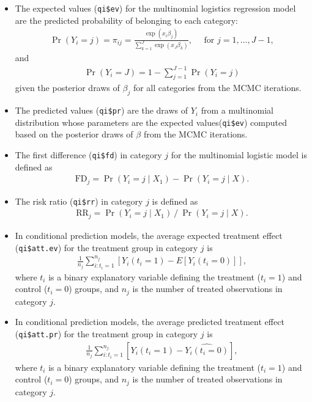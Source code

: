 \begin{itemize}
\item The expected values (\texttt{qi\$ev}) for the multinomial logistics
 regression model are the predicted probability of belonging to each
 category:
\begin{eqnarray*}
\Pr(Y_i=j)=\pi_{ij}=\frac{\exp(x_i \beta_j)}{\sum_{k=1}^J \exp(x_J
\beta_k)}, \quad \textrm{ for } j=1,\ldots, J-1,
\end{eqnarray*}
and 
\begin{eqnarray*}
\Pr(Y_i=J)=1-\sum_{j=1}^{J-1}\Pr(Y_i=j)
\end{eqnarray*}
given the posterior draws of $\beta_j$ for all categories from the 
MCMC iterations.

\item The predicted values (\texttt{qi\$pr}) are the draws of 
$Y_i$  from a multinomial distribution whose parameters are the expected 
values(\texttt{qi\$ev}) computed based on the posterior draws 
of $\beta$ from the MCMC iterations.

\item The first difference (\texttt{qi\$fd}) in category $j$ for the 
multinomial logistic model is defined as
\begin{eqnarray*}
\text{FD}_j=\Pr(Y_i=j\mid X_{1})-\Pr(Y_i=j\mid X).
\end{eqnarray*}

\item The risk ratio (\texttt{qi\$rr}) in category $j$ is defined as
\begin{eqnarray*}
\text{RR}_j=\Pr(Y_i=j\mid X_{1})\ /\ \Pr(Y_i=j\mid X).
\end{eqnarray*}


\item In conditional prediction models, the average expected treatment effect
(\texttt{qi\$att.ev}) for the treatment group in category $j$ is
\begin{eqnarray*}
\frac{1}{n_j}\sum_{i:t_{i}=1}^{n_j}[Y_{i}(t_{i}=1)-E[Y_{i}(t_{i}=0)]],
\end{eqnarray*}
where $t_{i}$ is a binary explanatory variable defining the treatment
($t_{i}=1$) and control ($t_{i}=0$) groups, and $n_j$ is the 
number of treated observations in category $j$.

\item In conditional prediction models, the average predicted treatment effect
(\texttt{qi\$att.pr}) for the treatment group in category $j$ is
\begin{eqnarray*}
\frac{1}{n_j}\sum_{i:t_{i}=1}^{n_j}[Y_{i}(t_{i}=1)-\widehat{Y_{i}(t_{i}=0)}],
\end{eqnarray*}
where $t_{i}$ is a binary explanatory variable defining the treatment
($t_{i}=1$) and control ($t_{i}=0$) groups, and $n_j$ is the 
number of treated observations in category $j$.
\end{itemize}


